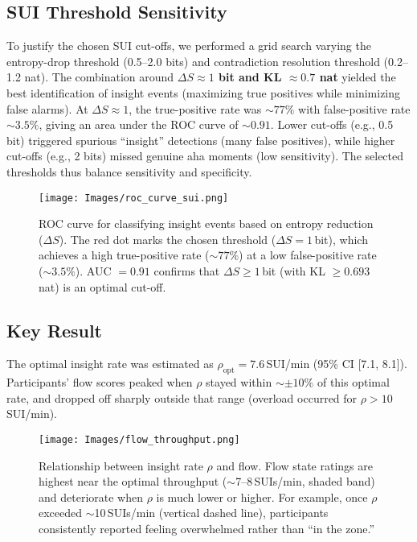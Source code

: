 \documentclass[12pt,a4paper]{article}
\begin{document}
\subsection{SUI Threshold Sensitivity}
To justify the chosen SUI cut-offs, we performed a grid search varying the entropy-drop threshold (0.5--2.0 bits) and contradiction resolution threshold (0.2--1.2 nat). The combination around \textbf{$\Delta S \approx 1$ bit and KL $\approx 0.7$ nat} yielded the best identification of insight events (maximizing true positives while minimizing false alarms). At $\Delta S \approx 1$, the true-positive rate was $\sim77\%$ with false-positive rate $\sim3.5\%$, giving an area under the ROC curve of $\sim0.91$. Lower cut-offs (e.g., 0.5 bit) triggered spurious ``insight'' detections (many false positives), while higher cut-offs (e.g., 2 bits) missed genuine aha moments (low sensitivity). The selected thresholds thus balance sensitivity and specificity.

\begin{figure}[H]
  \centering
  \texttt{[image: Images/roc\_curve\_sui.png]}
  \caption{ROC curve for classifying insight events based on entropy reduction ($\Delta S$). The red dot marks the chosen threshold ($\Delta S = 1$\,bit), which achieves a high true-positive rate ($\sim77\%$) at a low false-positive rate ($\sim3.5\%$). AUC $= 0.91$ confirms that $\Delta S \ge 1$\,bit (with KL $\ge 0.693$\,nat) is an optimal cut-off.}
\end{figure}

\subsection{Key Result}
The optimal insight rate was estimated as $\rho_{\mathrm{opt}} = 7.6$\,SUI/min (95\% CI [7.1, 8.1]). Participants’ flow scores peaked when $\rho$ stayed within $\sim\pm10\%$ of this optimal rate, and dropped off sharply outside that range (overload occurred for $\rho > 10$\,SUI/min).

\begin{figure}[H]
  \centering
  \texttt{[image: Images/flow\_throughput.png]}
  \caption{Relationship between insight rate $\rho$ and flow. Flow state ratings are highest near the optimal throughput ($\sim$7--8\,SUIs/min, shaded band) and deteriorate when $\rho$ is much lower or higher. For example, once $\rho$ exceeded $\sim$10\,SUIs/min (vertical dashed line), participants consistently reported feeling overwhelmed rather than ``in the zone.''}
\end{figure}
\end{document}
